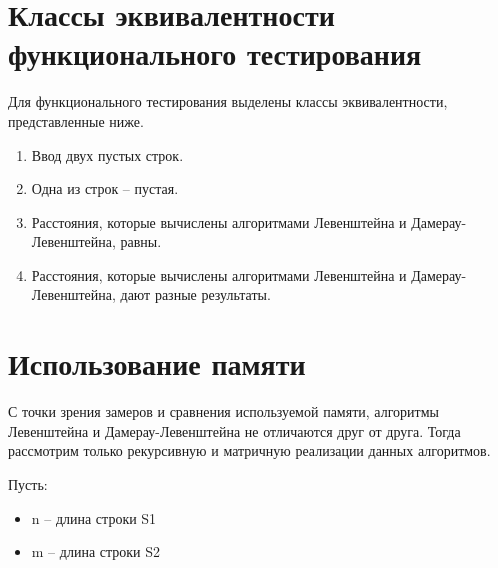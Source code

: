 
\clearpage

\section{Классы эквивалентности функционального тестирования}

Для функционального тестирования выделены классы эквивалентности, представленные ниже.

\begin{enumerate}
    \item Ввод двух пустых строк.
    \item Одна из строк -- пустая.
    \item Расстояния, которые вычислены алгоритмами Левенштейна и Дамерау-Левенштейна, равны.
    \item Расстояния, которые вычислены алгоритмами Левенштейна и Дамерау-Левенштейна, дают разные результаты.
\end{enumerate}

\section{Использование памяти}

С точки зрения замеров и сравнения используемой памяти, алгоритмы Левенштейна и Дамерау-Левенштейна не отличаются друг от друга.
Тогда рассмотрим только рекурсивную и матричную реализации данных алгоритмов.

Пусть:
\begin{itemize}
    \item n -- длина строки S1
    \item m -- длина строки S2
\end{itemize}

